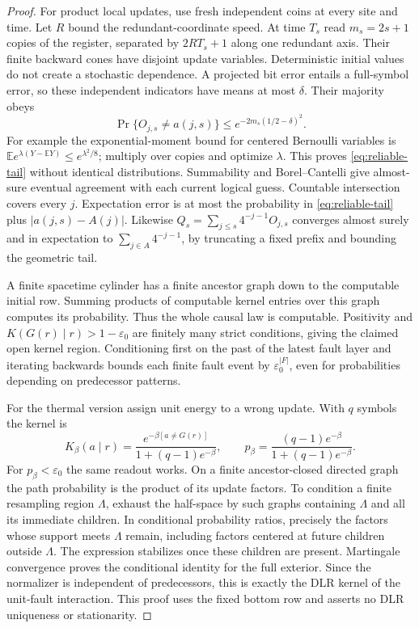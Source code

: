 \begin{proof}
For product local updates, use fresh independent coins at every
site and time. Let $R$ bound the redundant-coordinate speed. At
time $T_s$ read $m_s=2s+1$ copies of the register, separated by
$2RT_s+1$ along one redundant axis. Their finite backward cones
have disjoint update variables. Deterministic initial values do not
create a stochastic dependence. A projected bit error entails a
full-symbol error, so these independent indicators have means at
most $\delta$. Their majority obeys
\begin{equation}\label{eq:reliable-tail}
 \Pr\{O_{j,s}\ne a(j,s)\}
 \leq e^{-2m_s(1/2-\delta)^2}.
\end{equation}
For example the exponential-moment bound for centered Bernoulli
variables is $\mathbb E e^{\lambda(Y-\mathbb EY)}\leq
e^{\lambda^2/8}$; multiply over copies and optimize $\lambda$.
This proves \eqref{eq:reliable-tail} without identical distributions.
Summability and Borel--Cantelli give almost-sure eventual agreement
with each current logical guess. Countable intersection covers every
$j$. Expectation error is at most the probability in
\eqref{eq:reliable-tail} plus $|a(j,s)-A(j)|$.
Likewise $Q_s=\sum_{j\leq s}4^{-j-1}O_{j,s}$ converges almost
surely and in expectation to $\sum_{j\in A}4^{-j-1}$, by truncating
a fixed prefix and bounding the geometric tail.

A finite spacetime cylinder has a finite ancestor graph down to the
computable initial row. Summing products of computable kernel entries
over this graph computes its probability. Thus the whole causal law
is computable. Positivity and
$K(G(r)\mid r)>1-\varepsilon_0$ are finitely many strict conditions,
giving the claimed open kernel region. Conditioning first on the
past of the latest fault layer and iterating backwards bounds each
finite fault event by $\varepsilon_0^{|F|}$, even for probabilities
depending on predecessor patterns.

For the thermal version assign unit energy to a wrong update.
With $q$ symbols the kernel is
\[
 K_\beta(a\mid r)=
 \frac{e^{-\beta[a\ne G(r)]}}{1+(q-1)e^{-\beta}},\qquad
 p_\beta=\frac{(q-1)e^{-\beta}}{1+(q-1)e^{-\beta}}.
\]
For $p_\beta<\varepsilon_0$ the same readout works.
On a finite ancestor-closed directed graph the path probability is
the product of its update factors. To condition a finite resampling
region $\Lambda$, exhaust the half-space by such graphs containing
$\Lambda$ and all its immediate children. In conditional probability
ratios, precisely the factors whose support meets $\Lambda$ remain,
including factors centered at future children outside $\Lambda$.
The expression stabilizes once these children are present.
Martingale convergence proves the conditional identity for the full
exterior. Since the normalizer is independent of predecessors, this
is exactly the DLR kernel of the unit-fault interaction. This proof
uses the fixed bottom row and asserts no DLR uniqueness or stationarity.


\end{proof}
